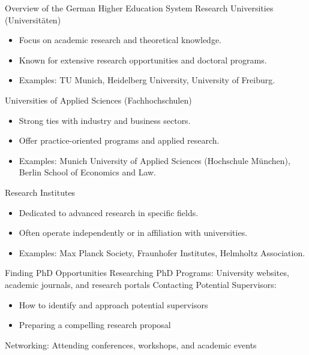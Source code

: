 \documentclass[10pt]{beamer}
\begin{document}
\begin{frame}[fragile]{Overview of the German Higher Education System}
\alert{Research Universities (Universitäten)}
	\begin{itemize}
		\item Focus on academic research and theoretical knowledge.
		\item Known for extensive research opportunities and doctoral programs.
		\item Examples: TU Munich, Heidelberg University, University of Freiburg.
	\end{itemize}
\alert{Universities of Applied Sciences (Fachhochschulen)}
	\begin{itemize}
		\item Strong ties with industry and business sectors.
		\item Offer practice-oriented programs and applied research.
		\item Examples: Munich University of Applied Sciences (Hochschule München), Berlin School of Economics and Law. 
	\end{itemize}
\alert{Research Institutes}
	\begin{itemize}
		\item Dedicated to advanced research in specific fields.
		\item Often operate independently or in affiliation with universities.
		\item Examples: Max Planck Society, Fraunhofer Institutes, Helmholtz Association.
	\end{itemize}
\end{frame}

\begin{frame}[fragile]{Finding PhD Opportunities}
Researching PhD Programs: University websites, academic journals, and research portals
Contacting Potential Supervisors:
\begin{itemize}
	\item How to identify and approach potential supervisors
	\item Preparing a compelling research proposal
\end{itemize}
Networking:
Attending conferences, workshops, and academic events
	
\end{frame}
\end{document}
